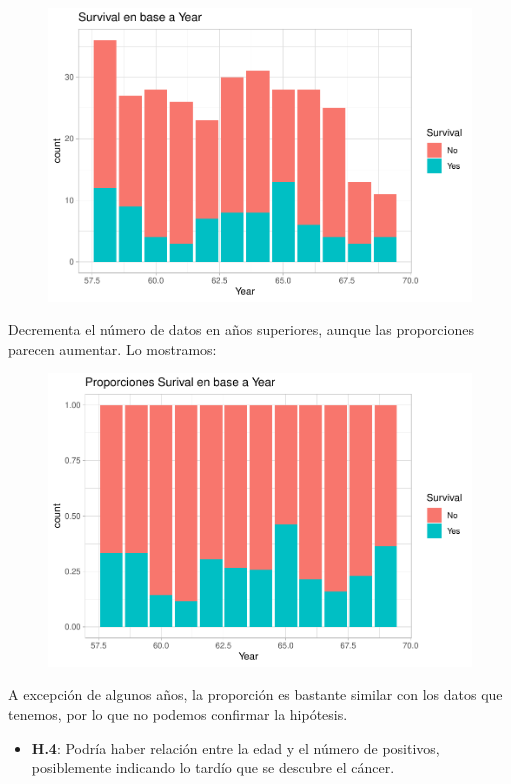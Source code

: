\begin{figure}[H]\includegraphics[width=.9\linewidth]{img/EDA2_files/figure-latex/unnamed-chunk-35-1} \end{figure}

Decrementa el número de datos en años superiores, aunque las proporciones parecen aumentar. Lo mostramos:

\begin{figure}[H]\includegraphics[width=.9\linewidth]{img/EDA2_files/figure-latex/unnamed-chunk-36-1} \end{figure}

A excepción de algunos años, la proporción es bastante similar con los datos que tenemos, por lo que no podemos confirmar la hipótesis.

\begin{itemize}
\item \textbf{H.4}: Podría haber relación entre la edad y el número de positivos,
posiblemente indicando lo tardío que se descubre el cáncer.
\end{itemize}

